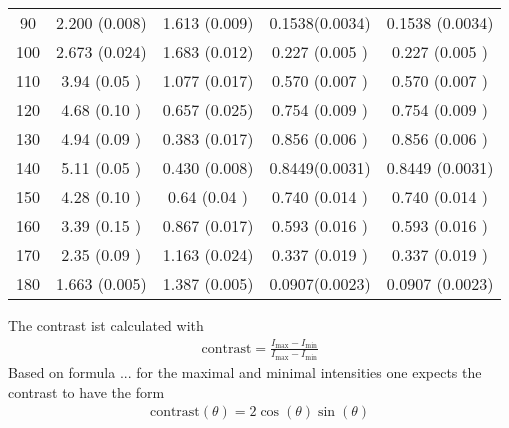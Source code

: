 \begin{table}[H]
\begin{tabular}{S S S S S}
		90                            & 2.200 (0.008)                 & 1.613 (0.009)                 & 0.1538(0.0034) & 0.1538 (0.0034) \\
		100                           & 2.673 (0.024)                 & 1.683 (0.012)                 & 0.227 (0.005 ) & 0.227 (0.005 )  \\
		110                           & 3.94  (0.05 )                 & 1.077 (0.017)                 & 0.570 (0.007 ) & 0.570 (0.007 )  \\
		120                           & 4.68  (0.10 )                 & 0.657 (0.025)                 & 0.754 (0.009 ) & 0.754 (0.009 )  \\
		130                           & 4.94  (0.09 )                 & 0.383 (0.017)                 & 0.856 (0.006 ) & 0.856 (0.006 )  \\
		140                           & 5.11  (0.05 )                 & 0.430 (0.008)                 & 0.8449(0.0031) & 0.8449 (0.0031) \\
		150                           & 4.28  (0.10 )                 & 0.64  (0.04 )                 & 0.740 (0.014 ) & 0.740 (0.014 )  \\
		160                           & 3.39  (0.15 )                 & 0.867 (0.017)                 & 0.593 (0.016 ) & 0.593 (0.016 )  \\
		170                           & 2.35  (0.09 )                 & 1.163 (0.024)                 & 0.337 (0.019 ) & 0.337 (0.019 )  \\
		180                           & 1.663 (0.005)                 & 1.387 (0.005)                 & 0.0907(0.0023) & 0.0907 (0.0023) \\
        
	\end{tabular}

\end{table}

The contrast ist calculated with
\begin{align}
    \text{contrast} = \frac{I_\text{max} -I_\text{min}}{I_\text{max}-I_\text{min}}
\end{align}
Based on formula ... for the maximal and minimal intensities one expects the contrast to have the form
\begin{align}
    \text{contrast}(\theta) = 2\cos(\theta)\sin(\theta) 
\end{align}



